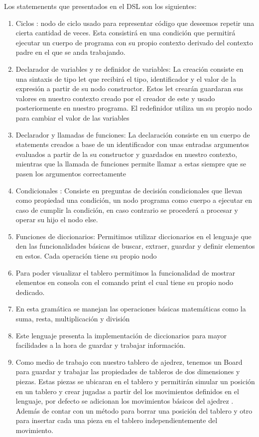 \documentclass[10pt,a4paper]{article}
\begin{document}
Los statemenents que presentados en el DSL son los siguientes: 
\begin{enumerate}
\item Ciclos : nodo de ciclo usado para representar código que deseemos repetir una cierta cantidad de veces. Esta consistirá en una condición que permitirá ejecutar un cuerpo de programa con su propio contexto derivado del contexto padre en el que se anda trabajando. 
 
\item Declarador de variables y re definidor de variables: La creación consiste en una sintaxis de tipo let que recibirá el tipo, identificador y el valor de la expresión a partir de su nodo constructor. Estos let crearán guardaran sus valores en nuestro contexto creado por el creador de este y usado posteriormente en nuestro programa. El redefinidor utiliza un su propio nodo para cambiar el valor de las variables 

\item Declarador y llamadas de funciones: La declaración consiste en un cuerpo de statements creados a base de un identificador  con unas entradas argumentos evaluados a partir de la su constructor y guardados en nuestro contexto, mientras que la llamada de funciones permite llamar a estas siempre  que se pasen los argumentos correctamente

\item Condicionales : Consiste en preguntas de decisión condicionales que llevan como propiedad una condición, un nodo programa como cuerpo a ejecutar en caso de cumplir la condición, en caso contrario se procederá a procesar y operar su hijo el nodo else.

\item Funciones de diccionarios: Permitimos utilizar diccionarios en el lenguaje que den las funcionalidades básicas de buscar, extraer, guardar y definir elementos en estos. Cada operación tiene su propio nodo

\item Para poder visualizar el tablero permitimos la funcionalidad de mostrar elementos en consola con el comando print el cual tiene su propio nodo dedicado.

\item En esta gramática se manejan las operaciones básicas matemáticas como la suma, resta, multiplicación y división


\item Este lenguaje presenta la implementación de diccionarios para mayor facilidades a la hora de guardar y trabajar información.

\item Como medio de trabajo con nuestro tablero de ajedrez, tenemos un Board para guardar y trabajar las propiedades de tableros de dos dimensiones y piezas. Estas piezas se ubicaran en el tablero y permitirán  simular un posición en un tablero y crear jugadas a partir del los movimientos definidos en el lenguaje, por defecto se adicionan los movimientos básicos del ajedrez . Además de contar con un método para borrar una posición del tablero y otro para insertar cada una pieza en el tablero independientemente del movimiento. 

\end{enumerate}
\end{document}
